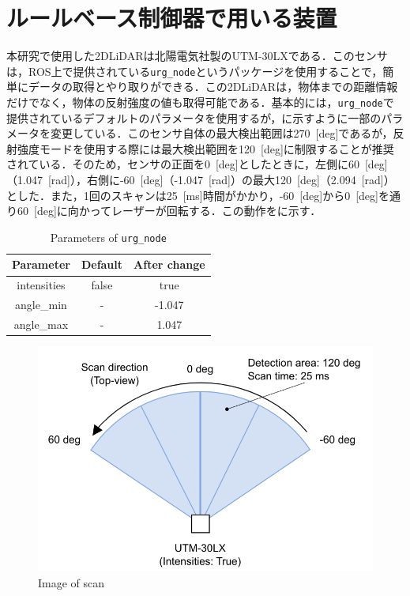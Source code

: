 
\section{ルールベース制御器で用いる装置}

  本研究で使用した2DLiDARは北陽電気社製のUTM-30LX\cite{hokuyo}である．このセンサは，ROS上で提供されている\texttt{urg\_node}\cite{urg_node}というパッケージを使用することで，簡単にデータの取得とやり取りができる．この2DLiDARは，物体までの距離情報だけでなく，物体の反射強度の値も取得可能である．基本的には，\texttt{urg\_node}で提供されているデフォルトのパラメータを使用するが，に示すように一部のパラメータを変更している．このセンサ自体の最大検出範囲は270 \,[deg]であるが，反射強度モードを使用する際には最大検出範囲を120 \,[deg]に制限することが推奨されている\cite{urg_node}．そのため，センサの正面を0 \,[deg]としたときに，左側に60 \,[deg]（1.047 \,[rad]），右側に-60 \,[deg]（-1.047 \,[rad]）の最大120 \,[deg]（2.094 \,[rad]）とした．また，1回のスキャンは25 \,[ms]時間がかかり，-60 \,[deg]から0 \,[deg]を通り60 \,[deg]に向かってレーザーが回転する．この動作をに示す．

  \begin{table}[hbtp]
    \caption{Parameters of \texttt{urg\_node}}
    \label{tab:parameters_of_urg_node}
    \centering
    \begin{tabular}{|c|c|c|}
    \hline
    Parameter   & Default & After change \\ \hline
    intensities & false   & true         \\ \hline
    angle\_min  & -       & -1.047       \\ \hline
    angle\_max  & -       & 1.047        \\ \hline
    \end{tabular}
    \end{table}

    \begin{figure}[h]
      \centering
      \includegraphics[keepaspectratio, scale=0.30] {images/RobotGuidance_hokuyo_scan.png}
      \captionsetup{justification=raggedright} %
      \caption{Image of scan}
      \label{Fig:Image of scan}
    \end{figure}

\newpage